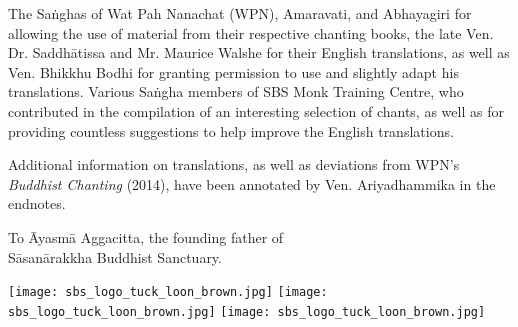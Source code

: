 
\cleartorecto
\thispagestyle{empty}

{

  \setlength{\parskip}{10pt}

   \fi
   \fi
   \fi


  The Saṅghas of Wat Pah Nanachat (WPN), Amaravati, and Abhayagiri for allowing the use of material from their respective chanting books, the late Ven. Dr. Saddhātissa and Mr. Maurice Walshe for their English translations, as well as Ven. Bhikkhu Bodhi for granting permission to use and slightly adapt his translations. Various Saṅgha members of SBS Monk Training Centre, who contributed in the compilation of an interesting selection of chants, as well as for providing countless suggestions to help improve the English translations.

  Additional information on translations, as well as deviations\makeatletter\hyperlink{endnote1-appendix}\makeatother\thickspace
  from WPN's \textit{Buddhist Chanting} (2014), have been annotated by Ven. Ariyadhammika in the endnotes.


  \ifninebythirteenversion \smallskip \else \medskip \fi

  {\centering

    To Āyasmā Aggacitta, the founding father of\\
    Sāsanārakkha Buddhist Sanctuary.

    \ifninebythirteenversion \smallskip \else \medskip \fi

    \begin{center}
      \ifafiveversion \texttt{[image: sbs\_logo\_tuck\_loon\_brown.jpg]} \fi
      \ifninebythirteenversion \texttt{[image: sbs\_logo\_tuck\_loon\_brown.jpg]}\fi
      \ifbfiveversion \texttt{[image: sbs\_logo\_tuck\_loon\_brown.jpg]}\fi
    \end{center}
  }
}

